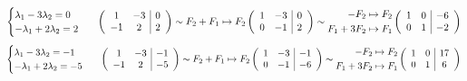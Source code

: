     \[
        \begin{cases}
            \lambda_1 - 3\lambda_2 = 0 \\
            -\lambda_1 + 2\lambda_2 = 2
        \end{cases}
        \hspace{0.25cm}
        \left(
        \begin{array}{cc|c}
            1 & -3 & 0 \\
            -1 & 2 & 2
        \end{array}
        \right)
        \sim
        \begin{aligned}
            F_2 + F_1 &\mapsto F_2 \\
        \end{aligned}
        \left(
        \begin{array}{cc|c}
            1 & -3 & 0 \\
            0 & -1 & 2
        \end{array}
        \right)
        \sim
        \begin{aligned}
            -F_2 &\mapsto F_2 \\
            F_1 + 3F_2 &\mapsto F_1 
        \end{aligned}
        \left(
        \begin{array}{cc|c}
            1 & 0 & -6 \\
            0 & 1 & -2
        \end{array}
        \right)
    \]
    \[
        \begin{cases}
            \lambda_1 - 3\lambda_2 = -1 \\
            -\lambda_1 + 2\lambda_2 = -5
        \end{cases}
        \hspace{0.25cm}
        \left(
        \begin{array}{cc|c}
            1 & -3 & -1 \\
            -1 & 2 & -5
        \end{array}
        \right)
        \sim
        \begin{aligned}
            F_2 + F_1 &\mapsto F_2 \\ 
        \end{aligned}
        \left(
        \begin{array}{cc|c}
            1 & -3 & -1 \\
            0 & -1 & -6
        \end{array}
        \right)
        \sim
        \begin{aligned}
            -F_2 &\mapsto F_2 \\ 
            F_1 + 3F_2 &\mapsto F_1 \\
        \end{aligned}
        \left(
        \begin{array}{cc|c}
            1 & 0 & 17 \\
            0 & 1 & 6
        \end{array}
        \right)
    \]
